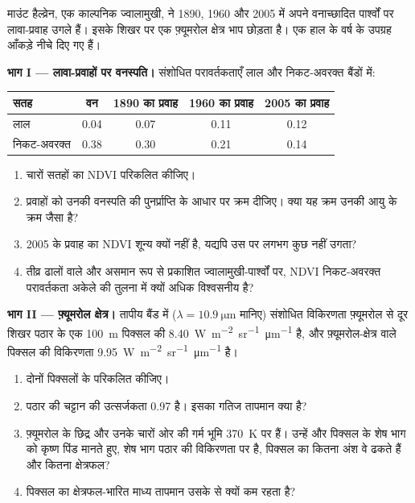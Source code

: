 \begin{problem}
\label{pb:b3:remote-sensing-gis:1}
माउंट हैल्व्रेन, एक काल्पनिक ज्वालामुखी, ने 1890, 1960
और 2005 में अपने वनाच्छादित पार्श्वों पर लावा-प्रवाह उगले हैं। इसके शिखर पर
एक फ़्यूमरोल क्षेत्र भाप छोड़ता है। एक हाल के वर्ष के उपग्रह आँकड़े नीचे दिए गए हैं।

\medskip\noindent\textbf{भाग I --- लावा-प्रवाहों पर वनस्पति।} संशोधित
परावर्तकताएँ लाल और निकट-अवरक्त बैंडों में:
\begin{center}
\small
\begin{tabular}{lcccc}
\hline
सतह & वन & 1890 का प्रवाह & 1960 का प्रवाह & 2005 का प्रवाह \\
\hline
लाल & 0.04 & 0.07 & 0.11 & 0.12 \\
निकट-अवरक्त & 0.38 & 0.30 & 0.21 & 0.14 \\
\hline
\end{tabular}
\end{center}
\begin{enumerate}
\item चारों सतहों का NDVI परिकलित कीजिए।
\item प्रवाहों को उनकी वनस्पति की पुनर्प्राप्ति के आधार पर क्रम दीजिए। क्या यह क्रम
  उनकी आयु के क्रम जैसा है?
\item 2005 के प्रवाह का NDVI शून्य क्यों नहीं है, यद्यपि उस पर
  लगभग कुछ नहीं उगता?
\item तीव्र ढालों वाले और असमान रूप से प्रकाशित ज्वालामुखी-पार्श्वों पर, NDVI
  निकट-अवरक्त परावर्तकता अकेले की तुलना में क्यों अधिक विश्वसनीय है?
\end{enumerate}

\medskip\noindent\textbf{भाग II --- फ़्यूमरोल क्षेत्र।} तापीय
बैंड में ($\lambda = \qty{10.9}{\micro\metre}$ मानिए) संशोधित विकिरणता
फ़्यूमरोल से दूर शिखर पठार के एक \qty{100}{m} पिक्सल की
\qty{8.40}{W.m^{-2}.sr^{-1}.\micro\metre^{-1}} है, और फ़्यूमरोल-क्षेत्र वाले पिक्सल की
विकिरणता \qty{9.95}{W.m^{-2}.sr^{-1}.\micro\metre^{-1}} है।
\begin{enumerate}[resume]
\item दोनों पिक्सलों के  परिकलित कीजिए।
\item पठार की चट्टान की उत्सर्जकता 0.97 है। इसका गतिज
  तापमान क्या है?
\item फ़्यूमरोल के छिद्र और उनके चारों ओर की गर्म भूमि
  \qty{370}{K} पर हैं। उन्हें और पिक्सल के शेष भाग को कृष्ण पिंड मानते हुए,
  शेष भाग पठार की विकिरणता पर है, पिक्सल का कितना अंश वे ढकते हैं
  और कितना क्षेत्रफल?
\item पिक्सल का क्षेत्रफल-भारित माध्य तापमान उसके  से क्यों
  कम रहता है?
\end{enumerate}


\end{problem}
